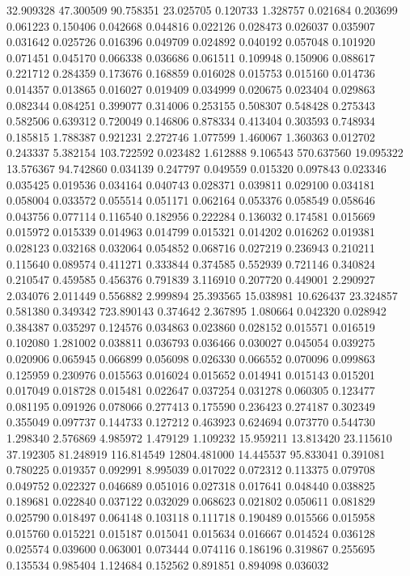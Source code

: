 32.909328
47.300509
90.758351
23.025705
0.120733
1.328757
0.021684
0.203699
0.061223
0.150406
0.042668
0.044816
0.022126
0.028473
0.026037
0.035907
0.031642
0.025726
0.016396
0.049709
0.024892
0.040192
0.057048
0.101920
0.071451
0.045170
0.066338
0.036686
0.061511
0.109948
0.150906
0.088617
0.221712
0.284359
0.173676
0.168859
0.016028
0.015753
0.015160
0.014736
0.014357
0.013865
0.016027
0.019409
0.034999
0.020675
0.023404
0.029863
0.082344
0.084251
0.399077
0.314006
0.253155
0.508307
0.548428
0.275343
0.582506
0.639312
0.720049
0.146806
0.878334
0.413404
0.303593
0.748934
0.185815
1.788387
0.921231
2.272746
1.077599
1.460067
1.360363
0.012702
0.243337
5.382154
103.722592
0.023482
1.612888
9.106543
570.637560
19.095322
13.576367
94.742860
0.034139
0.247797
0.049559
0.015320
0.097843
0.023346
0.035425
0.019536
0.034164
0.040743
0.028371
0.039811
0.029100
0.034181
0.058004
0.033572
0.055514
0.051171
0.062164
0.053376
0.058549
0.058646
0.043756
0.077114
0.116540
0.182956
0.222284
0.136032
0.174581
0.015669
0.015972
0.015339
0.014963
0.014799
0.015321
0.014202
0.016262
0.019381
0.028123
0.032168
0.032064
0.054852
0.068716
0.027219
0.236943
0.210211
0.115640
0.089574
0.411271
0.333844
0.374585
0.552939
0.721146
0.340824
0.210547
0.459585
0.456376
0.791839
3.116910
0.207720
0.449001
2.290927
2.034076
2.011449
0.556882
2.999894
25.393565
15.038981
10.626437
23.324857
0.581380
0.349342
723.890143
0.374642
2.367895
1.080664
0.042320
0.028942
0.384387
0.035297
0.124576
0.034863
0.023860
0.028152
0.015571
0.016519
0.102080
1.281002
0.038811
0.036793
0.036466
0.030027
0.045054
0.039275
0.020906
0.065945
0.066899
0.056098
0.026330
0.066552
0.070096
0.099863
0.125959
0.230976
0.015563
0.016024
0.015652
0.014941
0.015143
0.015201
0.017049
0.018728
0.015481
0.022647
0.037254
0.031278
0.060305
0.123477
0.081195
0.091926
0.078066
0.277413
0.175590
0.236423
0.274187
0.302349
0.355049
0.097737
0.144733
0.127212
0.463923
0.624694
0.073770
0.544730
1.298340
2.576869
4.985972
1.479129
1.109232
15.959211
13.813420
23.115610
37.192305
81.248919
116.814549
12804.481000
14.445537
95.833041
0.391081
0.780225
0.019357
0.092991
8.995039
0.017022
0.072312
0.113375
0.079708
0.049752
0.022327
0.046689
0.051016
0.027318
0.017641
0.048440
0.038825
0.189681
0.022840
0.037122
0.032029
0.068623
0.021802
0.050611
0.081829
0.025790
0.018497
0.064148
0.103118
0.111718
0.190489
0.015566
0.015958
0.015760
0.015221
0.015187
0.015041
0.015634
0.016667
0.014524
0.036128
0.025574
0.039600
0.063001
0.073444
0.074116
0.186196
0.319867
0.255695
0.135534
0.985404
1.124684
0.152562
0.891851
0.894098
0.036032
